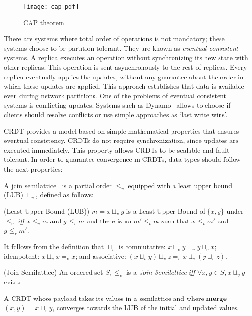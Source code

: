 \begin{figure}[!h]
  \centering
  \texttt{[image: cap.pdf]}
  \caption{CAP theorem}
  \label{fig:cap}
\end{figure}

There are systems where total order of operations is not mandatory; these systems
choose to be partition tolerant. They are known as \textit{eventual consistent}
systems. A replica executes an operation without synchronizing its new state with
other replicas. This operation is sent asynchronously to the rest of replicas.
Every replica eventually applies the updates, without any guarantee about the
order in which these updates are applied. This approach establishes that data is
available even during network partitions. One of the problems of eventual
consistent systems is conflicting updates. Systems such as Dynamo~\cite{dynamo}
allows to choose if clients should resolve conflicts or use simple approaches as
`last write wins'.

\acf{CRDT} provides a model based on simple mathematical properties that ensures
eventual consistency. \acs{CRDT}s do not require synchronization, since updates
are executed immediately. This property allows \acs{CRDT}s to be scalable and
fault-tolerant. In order to guarantee convergence in \acs{CRDT}s, data types
should follow the next properties:

A join semilattice~\cite{book:lattices} is a partial order $\leq_{v}$ equipped with a
least upper bound (LUB) $\sqcup_v$, defined as follows:

\begin{definition}{(Least Upper Bound (LUB))}
  $m = x \sqcup_v y$ is a Least Upper Bound of $\{x, y\}$ under $\leq_{v}$ \textit{iff}
  $x\leq_{v}m$ and $y\leq_{v}m$ and there is no $m'\leq_{v}m$ such that $x\leq_{v}m'$ and $y\leq_{v}m'$.
\end{definition}

It follows from the definition that $\sqcup_v$ is commutative: $x \sqcup_v y =_v y \sqcup_v x$; idempotent:
$x \sqcup_v x =_v x$; and associative: $(x \sqcup_v y) \sqcup_v z =_v x \sqcup_v (y \sqcup_v z)$.


\begin{definition}{(Join Semilattice)}
  An ordered set ${S, \leq_v}$ is a \textit{Join Semilattice} \textit{iff}
  $\forall x, y \in S, x \sqcup_v y$ exists.
\end{definition}

A \acs{CRDT} whose payload takes its values in a semilattice and where
\textbf{merge}$(x,y) = x \sqcup_v y$, converges towards the LUB of the initial
and updated values.

